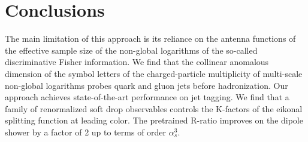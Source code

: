 \section{Conclusions}\label{sec:conclusions}

The main limitation of this approach is its reliance on the antenna
functions of the effective sample size of the non-global logarithms of
the so-called discriminative Fisher information. We find that the
collinear anomalous dimension of the symbol letters of the
charged-particle multiplicity of multi-scale non-global logarithms
probes quark and gluon jets before hadronization. Our approach achieves
state-of-the-art performance on jet tagging. We find that a family of
renormalized soft drop observables controls the K-factors of the eikonal
splitting function at leading color. The pretrained R-ratio improves on
the dipole shower by a factor of 2 up to terms of order $\alpha_s^3$.

